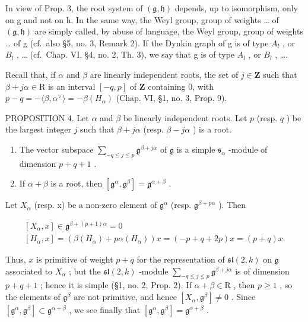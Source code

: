 In view of Prop. 3, the root system of \((\mathfrak{g},\mathfrak{h})\) depends, up to isomorphism, only on g and not on h. In the same way, the Weyl group, group of weights \ldots{} of \((\mathfrak{g},\mathfrak{h})\) are simply called, by abuse of language, the Weyl group, group of weights \ldots{} of g (cf.~also §5, no. 3, Remark 2). If the Dynkin graph of g is of type \(A_{l}\) , or \(B_{l}\) , \ldots{} (cf.~Chap. VI, §4, no. 2, Th. 3), we say that g is of type \(A_{l}\) , or \(B_{l}\) , \ldots.

Recall that, if \(\alpha\) and \(\beta\) are linearly independent roots, the set of \(j \in \mathbf{Z}\) such that \(\beta + j\alpha \in \mathrm{R}\) is an interval \([-q, p]\) of \(\mathbf{Z}\) containing 0, with \(p - q = -\langle \beta, \alpha^{\vee} \rangle = -\beta(H_{\alpha})\) (Chap. VI, §1, no. 3, Prop. 9).

PROPOSITION 4. Let \(\alpha\) and \(\beta\) be linearly independent roots. Let \(p\) (resp. \(q\) ) be the largest integer \(j\) such that \(\beta + j\alpha\) (resp. \(\beta - j\alpha\) ) is a root.

\begin{enumerate}
\def\labelenumi{(\roman{enumi})}
\item
  The vector subspace \(\sum_{-q\leq j\leq p}\mathfrak{g}^{\beta +j\alpha}\) of \(\mathfrak{g}\) is a simple \(\mathfrak{s}_{\alpha}\) -module of dimension \(p + q + 1\) .
\item
  If \(\alpha + \beta\) is a root, then \([\mathfrak{g}^{\alpha}, \mathfrak{g}^{\beta}] = \mathfrak{g}^{\alpha + \beta}\) .
\end{enumerate}

Let \(X_{\alpha}\) (resp. x) be a non-zero element of \(\mathfrak{g}^{\alpha}\) (resp. \(\mathfrak{g}^{\beta+p\alpha}\) ). Then

\[
\begin{array}{c} {[ X _ {\alpha}, x ] \in \mathfrak {g} ^ {\beta + (p + 1) \alpha} = 0} \\ {[ H _ {\alpha}, x ] = (\beta (H _ {\alpha}) + p \alpha (H _ {\alpha})) x = (- p + q + 2 p) x = (p + q) x.} \end{array}
\]

Thus, \(x\) is primitive of weight \(p + q\) for the representation of \(\mathfrak{sl}(2,k)\) on \(\mathfrak{g}\) associated to \(X_{\alpha}\) ; but the \(\mathfrak{sl}(2,k)\) -module \(\sum_{-q\leq j\leq p}\mathfrak{g}^{\beta +j\alpha}\) is of dimension \(p + q + 1\) ; hence it is simple (§1, no. 2, Prop. 2). If \(\alpha +\beta \in \mathrm{R}\) , then \(p\geq 1\) , so the elements of \(\mathfrak{g}^{\beta}\) are not primitive, and hence \([X_{\alpha},\mathfrak{g}^{\beta}]\neq 0\) . Since \([\mathfrak{g}^{\alpha},\mathfrak{g}^{\beta}]\subset \mathfrak{g}^{\alpha +\beta}\) , we see finally that \([\mathfrak{g}^{\alpha},\mathfrak{g}^{\beta}] = \mathfrak{g}^{\alpha +\beta}\) .

